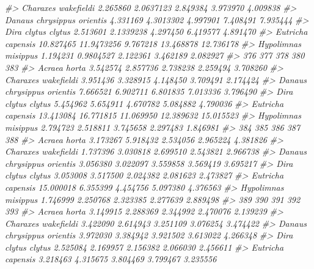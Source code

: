 \documentclass[
]{article}
\newenvironment{Shaded}{\begin{snugshade}}{\end{snugshade}}
\newcommand{\CommentTok}[1]{\textcolor[rgb]{0.56,0.35,0.01}{\textit{#1}}}
\begin{document}
\begin{Shaded}
\begin{Highlighting}[]
\CommentTok{\#\textgreater{} Charaxes wakefieldi         2.265860  2.0637123 2.849384  3.973970  4.009838}
\CommentTok{\#\textgreater{} Danaus chrysippus orientis  4.331169  4.3013302 4.997901  7.408491  7.935444}
\CommentTok{\#\textgreater{} Dira clytus clytus          2.513601  2.1339238 4.297450  6.419577  4.891470}
\CommentTok{\#\textgreater{} Eutricha capensis          10.827465 11.9473256 9.767218 13.468878 12.736178}
\CommentTok{\#\textgreater{} Hypolimnas misippus         1.194231  0.9804527 2.122361  3.462189  2.082927}
\CommentTok{\#\textgreater{}                                  376       377       378       380       383}
\CommentTok{\#\textgreater{} Acraea horta                3.542574  2.857736  2.738238  2.259494  3.708260}
\CommentTok{\#\textgreater{} Charaxes wakefieldi         3.951436  3.328915  4.148450  3.709491  2.174424}
\CommentTok{\#\textgreater{} Danaus chrysippus orientis  7.666521  6.902711  6.801835  7.013336  3.796490}
\CommentTok{\#\textgreater{} Dira clytus clytus          5.454962  5.654911  4.670782  5.084882  4.790036}
\CommentTok{\#\textgreater{} Eutricha capensis          13.413084 16.771815 11.069950 12.389632 15.015523}
\CommentTok{\#\textgreater{} Hypolimnas misippus         2.794723  2.518811  3.745658  2.297483  1.846981}
\CommentTok{\#\textgreater{}                                  384      385      386      387      388}
\CommentTok{\#\textgreater{} Acraea horta                3.173267 5.918432 2.534056 2.965224 4.381826}
\CommentTok{\#\textgreater{} Charaxes wakefieldi         1.737396 3.030818 2.699510 2.543821 2.966738}
\CommentTok{\#\textgreater{} Danaus chrysippus orientis  3.056380 3.022097 3.559858 3.569419 3.695217}
\CommentTok{\#\textgreater{} Dira clytus clytus          3.053008 3.517500 2.024382 2.081623 2.473827}
\CommentTok{\#\textgreater{} Eutricha capensis          15.000018 6.355399 4.454756 5.097380 4.376563}
\CommentTok{\#\textgreater{} Hypolimnas misippus         1.746999 2.250768 2.323385 2.277639 2.889498}
\CommentTok{\#\textgreater{}                                 389      390      391      392      393}
\CommentTok{\#\textgreater{} Acraea horta               3.149915 2.288369 2.344992 2.470076 2.139239}
\CommentTok{\#\textgreater{} Charaxes wakefieldi        3.422090 2.614943 3.251109 3.076254 3.474422}
\CommentTok{\#\textgreater{} Danaus chrysippus orientis 3.972030 3.384942 3.921502 3.613022 4.266348}
\CommentTok{\#\textgreater{} Dira clytus clytus         2.525084 2.169957 2.156382 2.066030 2.456611}
\CommentTok{\#\textgreater{} Eutricha capensis          3.218463 4.315675 3.804469 3.799467 3.235556}

\end{Highlighting}
\end{Shaded}
\end{document}

